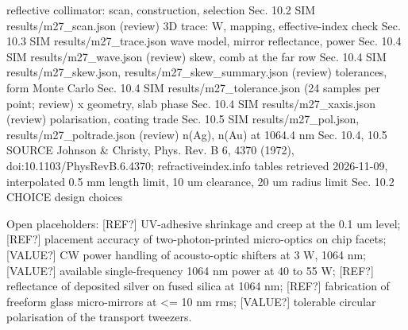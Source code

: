 \textbar{} reflective collimator: scan, construction, selection
\textbar{} Sec. 10.2 \textbar{} SIM \textbar{} results/m27\_scan.json
(review) \textbar{} \textbar{} 3D trace: W, mapping, effective-index
check \textbar{} Sec. 10.3 \textbar{} SIM \textbar{}
results/m27\_trace.json \textbar{} \textbar{} wave model, mirror
reflectance, power \textbar{} Sec. 10.4 \textbar{} SIM \textbar{}
results/m27\_wave.json (review) \textbar{} \textbar{} skew, comb at the
far row \textbar{} Sec. 10.4 \textbar{} SIM \textbar{}
results/m27\_skew.json, results/m27\_skew\_summary.json (review)
\textbar{} \textbar{} tolerances, form Monte Carlo \textbar{} Sec. 10.4
\textbar{} SIM \textbar{} results/m27\_tolerance.json (24 samples per
point; review) \textbar{} \textbar{} x geometry, slab phase \textbar{}
Sec. 10.4 \textbar{} SIM \textbar{} results/m27\_xaxis.json (review)
\textbar{} \textbar{} polarisation, coating trade \textbar{} Sec. 10.5
\textbar{} SIM \textbar{} results/m27\_pol.json,
results/m27\_poltrade.json (review) \textbar{} \textbar{} n(Ag), n(Au)
at 1064.4 nm \textbar{} Sec. 10.4, 10.5 \textbar{} SOURCE \textbar{}
Johnson \& Christy, Phys. Rev. B 6, 4370 (1972),
doi:10.1103/PhysRevB.6.4370; refractiveindex.info tables retrieved
2026-11-09, interpolated \textbar{} \textbar{} 0.5 mm length limit, 10
um clearance, 20 um radius limit \textbar{} Sec. 10.2 \textbar{} CHOICE
\textbar{} design choices \textbar{}

Open placeholders: {[}REF?{]} UV-adhesive shrinkage and creep at the 0.1
um level; {[}REF?{]} placement accuracy of two-photon-printed
micro-optics on chip facets; {[}VALUE?{]} CW power handling of
acousto-optic shifters at 3 W, 1064 nm; {[}VALUE?{]} available
single-frequency 1064 nm power at 40 to 55 W; {[}REF?{]} reflectance of
deposited silver on fused silica at 1064 nm; {[}REF?{]} fabrication of
freeform glass micro-mirrors at \textless= 10 nm rms; {[}VALUE?{]}
tolerable circular polarisation of the transport tweezers.
